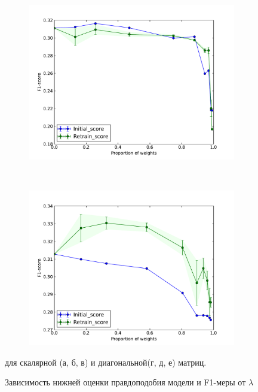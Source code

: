 \begin{figure}[!htp]
\begin{subfigure}[!htbp]{0.45\textwidth}
		\caption{}
		\label{score_I_D}
	\end{subfigure}
	\newline
	\begin{subfigure}[!htbp]{0.45\textwidth}
		\includegraphics[width=\textwidth]{plots/smerdov/portion_I_I.pdf}
		\caption{}
		\label{portion_I_I}
	\end{subfigure}
	~
	\begin{subfigure}[!htbp]{0.45\textwidth}
		\includegraphics[width=\textwidth]{plots/smerdov/portion_D_I.pdf}
		\caption{}
		\label{portion_I_D}
	\end{subfigure}
	\hspace{1mm}
	\caption{Зависимость нижней оценки правдоподобия модели и F1-меры от $\lambda$} для скалярной (а, б, в) и диагональной(г, д, е) матриц.
	\label{results}
\end{figure}
